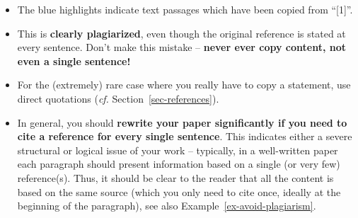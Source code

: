 \documentclass[11pt,a4paper]{article}
\begin{document}
\begin{badexample}
  \label{ex-plagiat1}
  \begin{figure}[H]
    \centering%
    {%
      \setlength{\fboxsep}{0pt}%
      \setlength{\fboxrule}{2pt}%
    }
  \end{figure}
  \begin{itemize}
    \item The blue highlights indicate text passages which have been copied from ``[1]''.
    \item This is \textbf{clearly plagiarized}, even though the original reference is stated at every sentence.
    Don't make this mistake -- \textbf{never ever copy content, not even a single sentence!}
    \item For the (extremely) rare case where you really have to copy a statement, use direct quotations (\emph{cf.} Section~\ref{sec-references}).
    \item In general, you should \textbf{rewrite your paper significantly if you need to cite a reference for every single sentence}. This indicates either a severe structural or logical issue of your work -- typically, in a well-written paper each paragraph should present information based on a single (or very few) reference(s). Thus, it should be clear to the reader that all the content is based on the same source (which you only need to cite once, ideally at the beginning of the paragraph), see also Example~\ref{ex-avoid-plagiarism}.
  \end{itemize}
\end{badexample}
\end{document}
